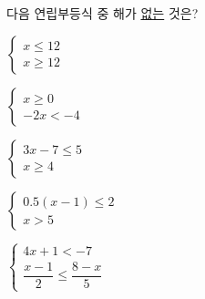 다음 연립부등식 중 해가 \underline{없는} 것은?
\begin{choicesii}{\rule[-3ex]{0pt}{8ex}$\begin{cases} x\le 12 \\ x\ge 12 \end{cases}$}{\rule[-3ex]{0pt}{8ex}$\begin{cases} x\ge 0 \\ -2x<-4 \end{cases}$}{\rule[-3ex]{0pt}{8ex}$\begin{cases} 3x-7\le 5 \\ x\ge 4 \end{cases}$}{\rule[-3ex]{0pt}{8ex}$\begin{cases} 0.5(x-1)\le 2 \\ x>5 \end{cases}$}{\rule[-3ex]{0pt}{8ex}$\begin{cases} 4x+1<-7 \\[0.6ex] \dfrac{x-1}{2}\le\dfrac{8-x}{5} \end{cases}$}\end{choicesii}
